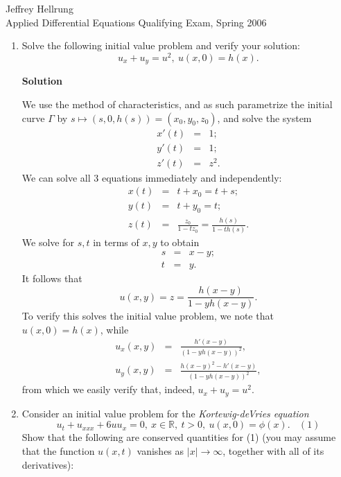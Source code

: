 \documentclass{article}
\begin{document}
\begin{flushright}
Jeffrey Hellrung \\
Applied Differential Equations Qualifying Exam, Spring 2006 \\
\end{flushright}


\begin{enumerate}

\item Solve the following initial value problem and verify your solution:
\[u_x + u_y = u^2, \ u(x,0) = h(x).\]

{\bf Solution}

We use the method of characteristics, and as such parametrize the initial curve \(\Gamma\) by \(s \mapsto (s, 0, h(s)) = (x_0,y_0,z_0)\), and solve the system
\begin{eqnarray*}
x'(t) & = & 1; \\
y'(t) & = & 1; \\
z'(t) & = & z^2.
\end{eqnarray*}
We can solve all \(3\) equations immediately and independently:
\begin{eqnarray*}
x(t) & = & t + x_0 = t + s; \\
y(t) & = & t + y_0 = t; \\
z(t) & = & \frac{z_0}{1 - t z_0} = \frac{h(s)}{1 - t h(s)}.
\end{eqnarray*}
We solve for \(s,t\) in terms of \(x,y\) to obtain
\begin{eqnarray*}
s & = & x - y; \\
t & = & y.
\end{eqnarray*}
It follows that
\[u(x,y) = z = \frac{h(x - y)}{1 - y h(x - y)}.\]
To verify this solves the initial value problem, we note that \(u(x,0) = h(x)\), while
\begin{eqnarray*}
u_x(x,y) & = & \frac{h'(x - y)}{(1 - y h(x - y))^2}, \\
u_y(x,y) & = & \frac{h(x - y)^2 - h'(x - y)}{(1 - y h(x - y))^2},
\end{eqnarray*}
from which we easily verify that, indeed, \(u_x + u_y = u^2\).



\item Consider an initial value problem for the {\em Kortewig-deVries equation}
\[u_t + u_{xxx} + 6 u u_x = 0, \ x \in \mathbb{R}, \ t > 0, \ u(x,0) = \phi(x). \ \ \ \ (1)\]
Show that the following are conserved quantities for (1) (you may assume that the function \(u(x,t)\) vanishes as \(|x| \to \infty\), together with all of its derivatives):


\end{enumerate}
\end{document}
